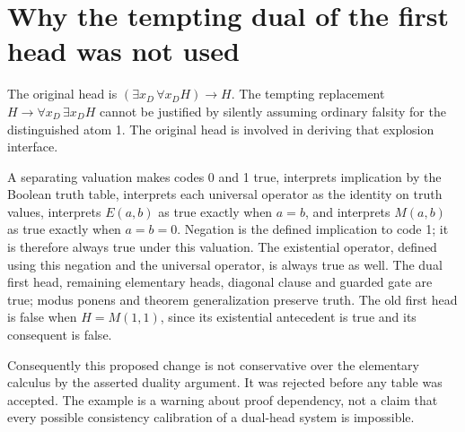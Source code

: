 \section*{Why the tempting dual of the first head was not used}

The original head is $(\exists x_D\,\forall x_D H)\to H$.
The tempting replacement $H\to\forall x_D\,\exists x_D H$ cannot be
justified by silently assuming ordinary falsity for the distinguished atom 1.
The original head is involved in deriving that explosion interface.

A separating valuation makes codes 0 and 1 true, interprets implication by
the Boolean truth table, interprets each universal operator as the identity
on truth values, interprets $E(a,b)$ as true exactly when $a=b$, and interprets
$M(a,b)$ as true exactly when $a=b=0$. Negation is the defined implication
to code 1; it is therefore always true under this valuation. The existential
operator, defined using this negation and the universal operator, is always
true as well. The dual first head, remaining elementary heads, diagonal
clause and guarded gate are true; modus ponens and theorem generalization
preserve truth. The old first head is false when $H=M(1,1)$, since its
existential antecedent is true and its consequent is false.

Consequently this proposed change is not conservative over the elementary
calculus by the asserted duality argument. It was rejected before any table
was accepted. The example is a warning about proof dependency, not a claim
that every possible consistency calibration of a dual-head system is impossible.
